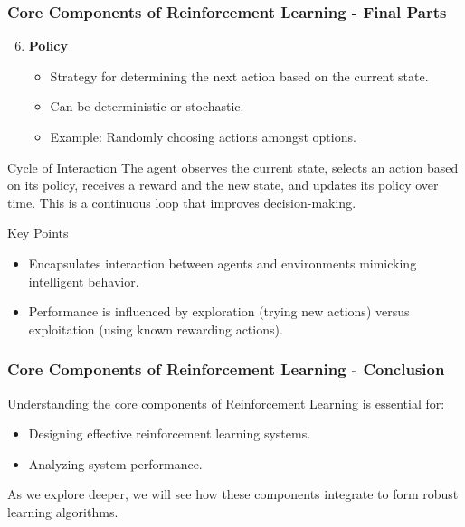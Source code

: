 \documentclass[aspectratio=169]{beamer}
\begin{document}
\begin{frame}[fragile]
    \frametitle{Core Components of Reinforcement Learning - Final Parts}
    \begin{enumerate}
        \setcounter{enumi}{5}
        \item \textbf{Policy}
            \begin{itemize}
                \item Strategy for determining the next action based on the current state.
                \item Can be deterministic or stochastic.
                \item Example: Randomly choosing actions amongst options.
            \end{itemize}
    \end{enumerate}
    
    \begin{block}{Cycle of Interaction}
        The agent observes the current state, selects an action based on its policy, receives a reward and the new state, and updates its policy over time. This is a continuous loop that improves decision-making.
    \end{block}

    \begin{block}{Key Points}
        \begin{itemize}
            \item Encapsulates interaction between agents and environments mimicking intelligent behavior.
            \item Performance is influenced by exploration (trying new actions) versus exploitation (using known rewarding actions).
        \end{itemize}
    \end{block}
\end{frame}

\begin{frame}[fragile]
    \frametitle{Core Components of Reinforcement Learning - Conclusion}
    Understanding the core components of Reinforcement Learning is essential for:
    \begin{itemize}
        \item Designing effective reinforcement learning systems.
        \item Analyzing system performance.
    \end{itemize}
    As we explore deeper, we will see how these components integrate to form robust learning algorithms.
\end{frame}
\end{document}
